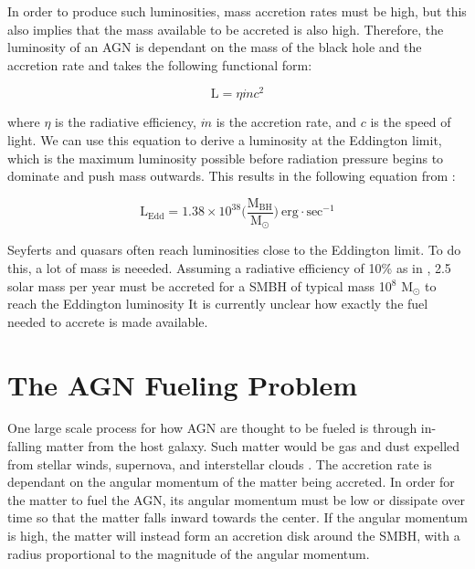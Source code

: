 In order to produce such luminosities, mass accretion rates must be high, but this also implies that the mass available to be accreted is also high.
Therefore, the luminosity of an AGN is dependant on the mass of the black hole and the accretion rate and takes the following functional form:

\begin{equation}
    \text{L} = \eta  \dot{m}  c^2
\end{equation}

where $\eta$ is the radiative efficiency, $\dot{m}$ is the accretion rate, and $c$ is the speed of light.
 We can use this equation to derive a luminosity at the Eddington limit, which is the maximum luminosity possible before radiation pressure begins to dominate and push mass outwards.
This results in the following equation from \cite{peterson1997}:

\begin{equation}
    \text{L}_{ \text{Edd}  } = 1.38\times 10^{38} \Big ( \frac{ \text{M}_{  \text{BH} }  }{ \text{M}_{\odot}   } \Big ) \ \text{erg} \cdot \text{sec}^{-1} 
\end{equation}


Seyferts and quasars often reach luminosities close to the Eddington limit.
To do this, a lot of mass is neeeded.
Assuming a radiative efficiency of 10\% as in \cite{soltan1982}, 2.5 solar mass per year must be accreted for a SMBH  of typical mass 10$^8$ M$_{\odot}$ to reach the Eddington luminosity
It is currently unclear how exactly the fuel needed to accrete is made available. 



\section{The AGN Fueling Problem}
\label{sub1_3}

 One large scale process for how AGN are thought to be fueled is through in-falling matter from the host galaxy. Such matter would be gas and dust expelled from stellar winds, supernova, and interstellar clouds \citep{balick&heckman1982}.
The accretion rate is dependant on the angular momentum of the matter being accreted.
In order for the matter to fuel the AGN, its angular momentum must be low or dissipate over time so that the matter falls inward towards the center.
If the angular momentum is high, the matter will instead form an accretion disk around the SMBH, with a radius proportional to the magnitude of the angular momentum.

